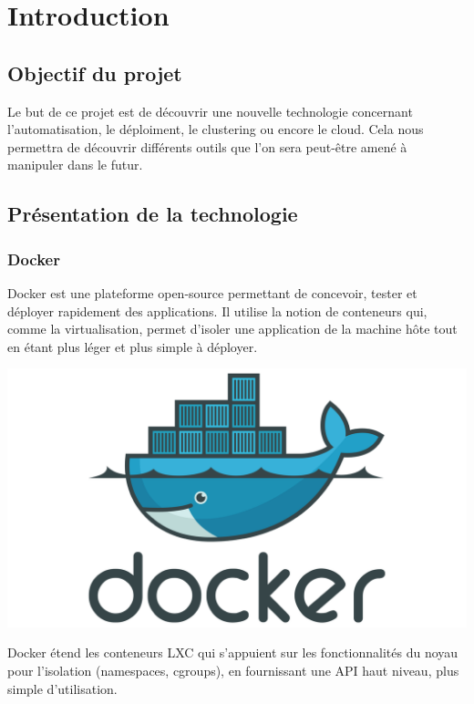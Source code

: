 \chapter{Introduction}

\section{Objectif du projet}

Le but de ce projet est de découvrir une nouvelle technologie concernant l'automatisation, le
déploiment, le clustering ou encore le cloud. Cela nous permettra de découvrir différents outils
que l'on sera peut-être amené à manipuler dans le futur.

\section{Présentation de la technologie}

\subsection{Docker}

\begin{paracol}{2}

Docker est une plateforme open-source permettant de concevoir, tester et déployer rapidement des
applications. Il utilise la notion de conteneurs qui, comme la virtualisation, permet d’isoler
une application de la machine hôte tout en étant plus léger et plus simple à déployer.

\switchcolumn

\includegraphics[width=0.7\linewidth]{img/docker}

\end{paracol}
\jmp

Docker étend les conteneurs LXC qui s’appuient sur les fonctionnalités du noyau pour l’isolation
(namespaces, cgroups), en fournissant une API haut niveau, plus simple d’utilisation.\newline

